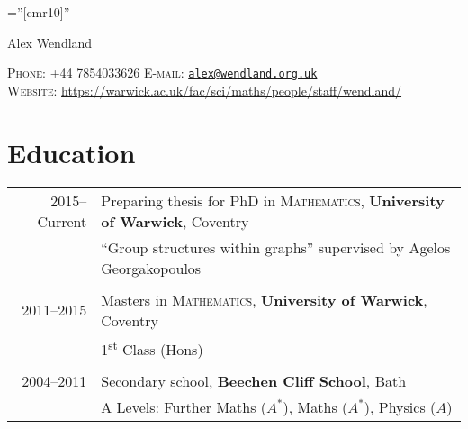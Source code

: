 \documentclass[a4paper,10pt]{article}
\begin{document}

\pagestyle{empty} %

\font\fb=''[cmr10]'' %

\par{\centering
		{\Huge Alex Wendland
	}\bigskip\par}
\begin{center}
	\textsc{Phone:} +44 7854033626 \hspace{5cm} \textsc{E-mail:} \href{mailto:alex@wendland.org.uk}{\texttt{alex@wendland.org.uk}}\\
	\textsc{Website:} \href{https://warwick.ac.uk/fac/sci/maths/people/staff/wendland/}{https://warwick.ac.uk/fac/sci/maths/people/staff/wendland/}
\end{center}


\section{Education}
\begin{tabular}{rl}	
\textsc{} 2015--Current \hspace{-0.12cm} & Preparing thesis for PhD in \textsc{Mathematics}, \textbf{University of Warwick}, Coventry\\
& ``Group structures within graphs'' supervised by Agelos Georgakopoulos\\
&\\
\textsc{} 2011--2015& Masters in \textsc{Mathematics}, \textbf{University of Warwick}, Coventry\\
& 1\textsuperscript{st} Class (Hons)\\ &\\
\textsc{} 2004--2011& Secondary school, \textbf{Beechen Cliff School}, Bath\\
&  A Levels: Further Maths ($A^{\ast}$), Maths ($A^{\ast}$), Physics ($A$)\\
\end{tabular}
\end{document}

